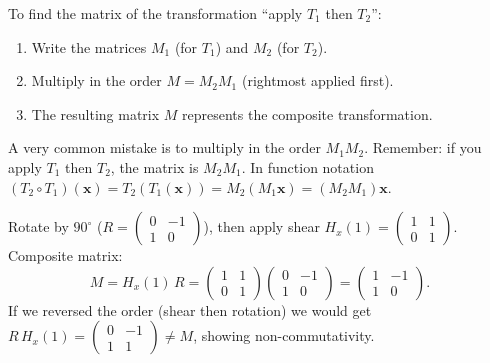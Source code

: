 \documentclass[11pt]{article}
\begin{document}
\begin{methode}
To find the matrix of the transformation ``apply $T_1$ then $T_2$'':
\begin{enumerate}
\item Write the matrices $M_1$ (for $T_1$) and $M_2$ (for $T_2$).
\item Multiply in the order $M = M_2 M_1$ (rightmost applied first).
\item The resulting matrix $M$ represents the composite transformation.
\end{enumerate}
\end{methode}

\begin{attention}
A very common mistake is to multiply in the order $M_1 M_2$. Remember: if you apply $T_1$ then $T_2$, the matrix is $M_2 M_1$. In function notation $(T_2 \circ T_1)(\mathbf{x}) = T_2(T_1(\mathbf{x})) = M_2(M_1\mathbf{x}) = (M_2 M_1)\mathbf{x}$.
\end{attention}

\begin{exemplebox}
Rotate by $90^\circ$ ($R = \begin{pmatrix} 0 & -1 \\ 1 & 0 \end{pmatrix}$), then apply shear $H_x(1) = \begin{pmatrix} 1 & 1 \\ 0 & 1 \end{pmatrix}$.
Composite matrix:
\[
M = H_x(1) \, R = \begin{pmatrix} 1 & 1 \\ 0 & 1 \end{pmatrix}
\begin{pmatrix} 0 & -1 \\ 1 & 0 \end{pmatrix}
= \begin{pmatrix} 1 & -1 \\ 1 & 0 \end{pmatrix}.
\]
If we reversed the order (shear then rotation) we would get
$R\,H_x(1) = \begin{pmatrix} 0 & -1 \\ 1 & 1 \end{pmatrix} \neq M$, showing non-commutativity.
\end{exemplebox}
\end{document}
